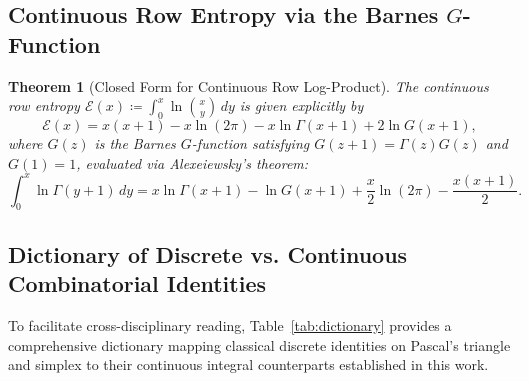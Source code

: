 \documentclass[11pt,a4paper]{article}
\theoremstyle{plain}
\newtheorem{theorem}{Theorem}[section]
\theoremstyle{definition}
\theoremstyle{remark}
\numberwithin{equation}{section}
\begin{document}
\subsection{Continuous Row Entropy via the Barnes \texorpdfstring{$G$}{G}-Function}

\begin{theorem}[Closed Form for Continuous Row Log-Product]
The continuous row entropy $\mathcal{E}(x) \coloneqq \int_0^x \ln \binom{x}{y}\,dy$ is given explicitly by
\begin{equation}
\mathcal{E}(x) = x(x+1) - x\ln(2\pi) - x\ln\Gamma(x+1) + 2\ln G(x+1),
\end{equation}
where $G(z)$ is the Barnes $G$-function \cite{barnes1900} satisfying $G(z+1) = \Gamma(z)G(z)$ and $G(1) = 1$, evaluated via Alexeiewsky's theorem:
\begin{equation}
\int_0^x \ln\Gamma(y+1)\,dy = x\ln\Gamma(x+1) - \ln G(x+1) + \frac{x}{2}\ln(2\pi) - \frac{x(x+1)}{2}.
\end{equation}
\end{theorem}

\subsection{Dictionary of Discrete vs. Continuous Combinatorial Identities}

To facilitate cross-disciplinary reading, Table~\ref{tab:dictionary} provides a comprehensive dictionary mapping classical discrete identities on Pascal's triangle and simplex to their continuous integral counterparts established in this work.
\end{document}
